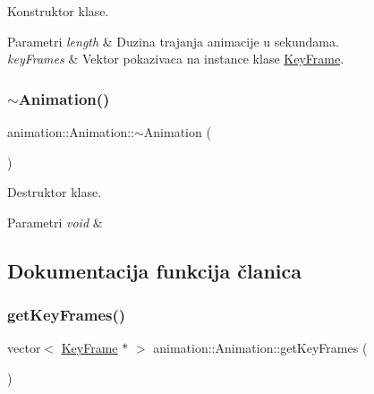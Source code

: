 Konstruktor klase. 


\begin{DoxyParams}{Parametri}
{\em length} & Duzina trajanja animacije u sekundama. \\
\hline
{\em key\+Frames} & Vektor pokazivaca na instance klase \hyperlink{classanimation_1_1KeyFrame}{Key\+Frame}. \\
\hline
\end{DoxyParams}
\mbox{\label{classanimation_1_1Animation_a558c8041047da1b0fbe573a934b270d3}} 
\subsubsection{\texorpdfstring{$\sim$\+Animation()}{~Animation()}}
{\footnotesize\ttfamily animation\+::\+Animation\+::$\sim$\+Animation (\begin{DoxyParamCaption}{ }\end{DoxyParamCaption})}



Destruktor klase. 


\begin{DoxyParams}{Parametri}
{\em void} & \\
\hline
\end{DoxyParams}


\subsection{Dokumentacija funkcija članica}
\mbox{\label{classanimation_1_1Animation_ae8d6214ee3a10015f12b7aa7c6e5c1b7}} 
\subsubsection{\texorpdfstring{get\+Key\+Frames()}{getKeyFrames()}}
{\footnotesize\ttfamily vector$<$ \hyperlink{classanimation_1_1KeyFrame}{Key\+Frame} $\ast$ $>$ animation\+::\+Animation\+::get\+Key\+Frames (\begin{DoxyParamCaption}{ }\end{DoxyParamCaption})}



